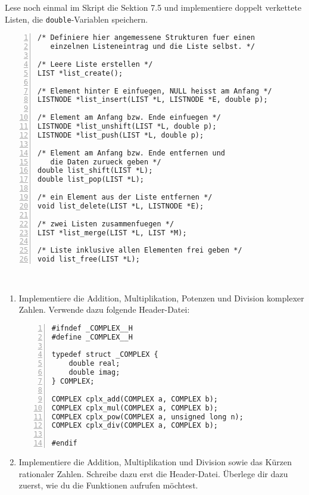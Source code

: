 \documentclass{uebungszettel}
\begin{document}
\begin{aufg} 
Lese noch einmal im Skript die Sektion 7.5 und implementiere doppelt verkettete Listen, die \verb|double|-Variablen speichern.

\medskip\begin{codelisting}
\begin{lstlisting}[numbers=left,numberstyle=\tiny,frame=tlrb]
/* Definiere hier angemessene Strukturen fuer einen
   einzelnen Listeneintrag und die Liste selbst. */

/* Leere Liste erstellen */
LIST *list_create();

/* Element hinter E einfuegen, NULL heisst am Anfang */
LISTNODE *list_insert(LIST *L, LISTNODE *E, double p);

/* Element am Anfang bzw. Ende einfuegen */
LISTNODE *list_unshift(LIST *L, double p);
LISTNODE *list_push(LIST *L, double p);

/* Element am Anfang bzw. Ende entfernen und 
   die Daten zurueck geben */
double list_shift(LIST *L);
double list_pop(LIST *L);

/* ein Element aus der Liste entfernen */
void list_delete(LIST *L, LISTNODE *E);

/* zwei Listen zusammenfuegen */
LIST *list_merge(LIST *L, LIST *M);

/* Liste inklusive allen Elementen frei geben */
void list_free(LIST *L);

\end{lstlisting}
\end{codelisting}
\end{aufg}

\newpage
\begin{aufg}
~\begin{enumerate}
\item
Implementiere die Addition, Multiplikation, Potenzen und Division komplexer Zahlen. Verwende dazu folgende Header-Datei:
\begin{codelisting}
\begin{lstlisting}[numbers=left,numberstyle=\tiny,frame=tlrb]
#ifndef _COMPLEX__H
#define _COMPLEX__H

typedef struct _COMPLEX {
	double real;
	double imag;
} COMPLEX;

COMPLEX cplx_add(COMPLEX a, COMPLEX b);
COMPLEX cplx_mul(COMPLEX a, COMPLEX b);
COMPLEX cplx_pow(COMPLEX a, unsigned long n);
COMPLEX cplx_div(COMPLEX a, COMPLEX b);

#endif
\end{lstlisting}
\end{codelisting}
\item Implementiere die Addition, Multiplikation und Division sowie das Kürzen rationaler Zahlen. Schreibe dazu erst 
die Header-Datei. Überlege dir dazu zuerst, wie du die Funktionen aufrufen möchtest.
\end{enumerate}
\end{aufg}
\end{document}
